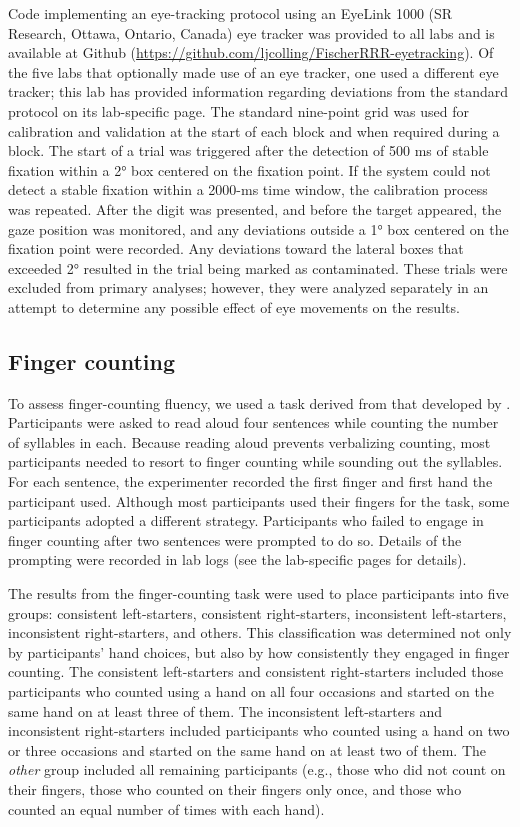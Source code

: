\documentclass[man,floatsintext]{apa6}
\theoremstyle{definition}
\theoremstyle{definition}
\theoremstyle{definition}
\theoremstyle{remark}
\begin{document}
Code implementing an eye-tracking protocol using an EyeLink 1000 (SR
Research, Ottawa, Ontario, Canada) eye tracker was provided to all labs
and is available at Github
(\url{https://github.com/ljcolling/FischerRRR-eyetracking}). Of the five
labs that optionally made use of an eye tracker, one used a different
eye tracker; this lab has provided information regarding deviations from
the standard protocol on its lab-specific page. The standard nine-point
grid was used for calibration and validation at the start of each block
and when required during a block. The start of a trial was triggered
after the detection of 500 ms of stable fixation within a 2° box
centered on the fixation point. If the system could not detect a stable
fixation within a 2000-ms time window, the calibration process was
repeated. After the digit was presented, and before the target appeared,
the gaze position was monitored, and any deviations outside a 1° box
centered on the fixation point were recorded. Any deviations toward the
lateral boxes that exceeded 2° resulted in the trial being marked as
contaminated. These trials were excluded from primary analyses; however,
they were analyzed separately in an attempt to determine any possible
effect of eye movements on the results.

\subsection{Finger counting}\label{finger-counting}

To assess finger-counting fluency, we used a task derived from that
developed by \textcite{Lucidi:2014gn}. Participants were asked to read
aloud four sentences while counting the number of syllables in each.
Because reading aloud prevents verbalizing counting, most participants
needed to resort to finger counting while sounding out the syllables.
For each sentence, the experimenter recorded the first finger and first
hand the participant used. Although most participants used their fingers
for the task, some participants adopted a different strategy.
Participants who failed to engage in finger counting after two sentences
were prompted to do so. Details of the prompting were recorded in lab
logs (see the lab-specific pages for details).

The results from the finger-counting task were used to place
participants into five groups: consistent left-starters, consistent
right-starters, inconsistent left-starters, inconsistent right-starters,
and others. This classification was determined not only by participants'
hand choices, but also by how consistently they engaged in finger
counting. The consistent left-starters and consistent right-starters
included those participants who counted using a hand on all four
occasions and started on the same hand on at least three of them. The
inconsistent left-starters and inconsistent right-starters included
participants who counted using a hand on two or three occasions and
started on the same hand on at least two of them. The \emph{other} group
included all remaining participants (e.g., those who did not count on
their fingers, those who counted on their fingers only once, and those
who counted an equal number of times with each hand).
\end{document}
